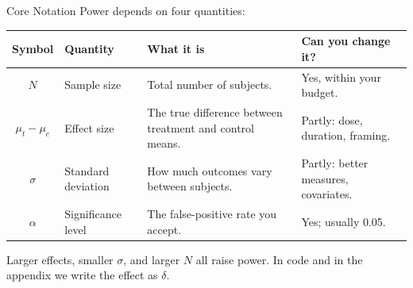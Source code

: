 \documentclass[
  ignorenonframetext,
  aspectratio=169,
]{beamer}
\begin{document}
\begin{frame}{Core Notation}
\label{core-notation}
Power depends on four quantities:

\vspace{0.5em}

\begin{center}
\small
\setlength{\tabcolsep}{7pt}
\renewcommand{\arraystretch}{1.35}
\begin{tabular}{c>{\raggedright\arraybackslash}p{2.7cm}>{\raggedright\arraybackslash}p{5.6cm}>{\raggedright\arraybackslash}p{3.6cm}}
\toprule
\textbf{Symbol} & \textbf{Quantity} & \textbf{What it is} & \textbf{Can you change it?} \\
\midrule
$N$              & Sample size        & Total number of subjects. & Yes, within your budget. \\
$\mu_t - \mu_c$  & Effect size        & The true difference between treatment and control means. & Partly: dose, duration, framing. \\
$\sigma$         & Standard deviation & How much outcomes vary between subjects. & Partly: better measures, covariates. \\
$\alpha$         & Significance level & The false-positive rate you accept. & Yes; usually 0.05. \\
\bottomrule
\end{tabular}
\end{center}

\vspace{0.4em}

\begin{center}
\small Larger effects, smaller $\sigma$, and larger $N$ all raise power. In code and in the appendix we write the effect as $\delta$.
\end{center}
\end{frame}
\end{document}

